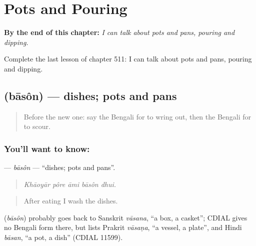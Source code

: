 
\chapter{Pots and Pouring}
\label{ch:bn-pots-and-pouring}

\begin{chapteropening}
\textbf{By the end of this chapter:} \emph{I can talk about pots and pans, pouring and dipping.}

Complete the last lesson of chapter 511: I can talk about pots and pans, pouring and dipping.
\end{chapteropening}

\section[\texorpdfstring{\bn{বাসন} (bāsôn)}{বাসন (bāsôn)}]{ (bāsôn) — dishes; pots and pans}

\label{lesson:BN-C511-bason}



\begin{quote}
Before the new one: say the Bengali for to wring out, then the Bengali for to scour.
\end{quote}

\subsection*{You'll want to know: }
\textbf{} — \emph{bāsôn} — \textquotedblleft{}dishes; pots and pans\textquotedblright{}.

\begin{quote}
    
\end{quote}

\begin{quote}
\emph{Khāoyār pôre āmi bāsôn dhui.}
\end{quote}

\begin{quote}
After eating I wash the dishes.
\end{quote}

\begin{cousinweb}
\textbf{} (\emph{bāsôn}) probably goes back to Sanskrit \emph{vāsana}, \textquotedblleft{}a box, a casket\textquotedblright{}; CDIAL gives no Bengali form there, but lists Prakrit \emph{vāsaṇa}, \textquotedblleft{}a vessel, a plate\textquotedblright{}, and Hindi \emph{bāsan}, \textquotedblleft{}a pot, a dish\textquotedblright{} (CDIAL 11599).
\end{cousinweb}

